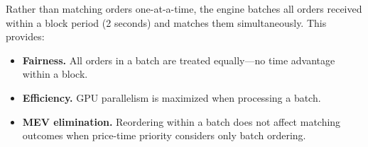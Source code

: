 Rather than matching orders one-at-a-time, the engine batches all orders received within a block period (2 seconds) and matches them simultaneously. This provides:

\begin{itemize}
    \item \textbf{Fairness.} All orders in a batch are treated equally---no time advantage within a block.
    \item \textbf{Efficiency.} GPU parallelism is maximized when processing a batch.
    \item \textbf{MEV elimination.} Reordering within a batch does not affect matching outcomes when price-time priority considers only batch ordering.
\end{itemize}

